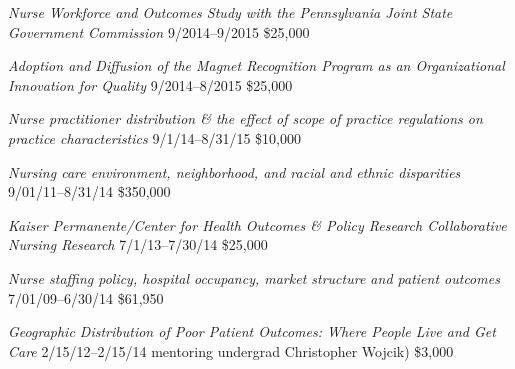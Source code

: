 \documentclass[10pt,]{article}
\begin{document}
{{{{{{{{{{{{{{\textit {Nurse Workforce and Outcomes Study with the Pennsylvania Joint State Government Commission} \hfill 9/2014--9/2015 \newline
{}	\hfill \$25,000

\textit {Adoption and Diffusion of the  Magnet Recognition Program as an Organizational Innovation for Quality} \hfill 9/2014--8/2015 \newline
{}	\hfill \$25,000

\textit {Nurse practitioner distribution \& the effect of scope of practice regulations on practice characteristics} \hfill 9/1/14--8/31/15 \newline
{}	\hfill \$10,000

\textit {Nursing care environment, neighborhood, and racial and ethnic disparities} \hfill 9/01/11--8/31/14 \newline
{} \hfill \$350,000

\textit {Kaiser Permanente/Center for Health Outcomes \& Policy Research Collaborative Nursing Research} \hfill 7/1/13--7/30/14 \newline
{} \hfill \$25,000

\textit {Nurse staffing policy, hospital occupancy, market structure and patient outcomes} \hfill 7/01/09--6/30/14 \newline
{} \hfill \$61,950

\textit {Geographic Distribution of Poor Patient Outcomes: Where People Live and Get Care} \hfill 2/15/12--2/15/14 \newline
{ mentoring undergrad Christopher Wojcik)}	\hfill \$3,000

}}}}}}}}}}}}}}
\end{document}
